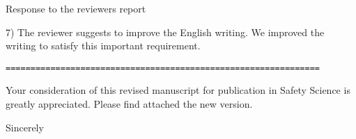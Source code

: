 \documentclass[a4paper,12pt]{letter}
\begin{document}
\begin{letter}{Response to the reviewers report}
{7) The reviewer suggests to improve the English writing. We improved the writing to satisfy this important requirement.  \\

\begin{verbatim}
===============================================================
\end{verbatim}

}

Your consideration of this revised manuscript for publication in 
Safety Science is greatly appreciated. 
Please find attached the new version. \\

\signature{Ignacio Sticco, Guillermo Frank, Fernando Cornes and Claudio Dorso}
\closing{Sincerely}




\end{letter}
\end{document}
